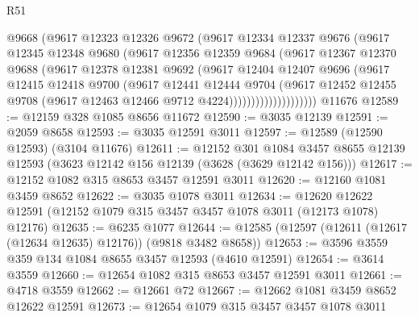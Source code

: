 \begin{lexlean}{R51}
\begin{coremodule}
                      @9668
                      (@9617
                        @12323
                        @12326
                        @9672
                        (@9617
                          @12334
                          @12337
                          @9676
                          (@9617
                            @12345
                            @12348
                            @9680
                            (@9617
                              @12356
                              @12359
                              @9684
                              (@9617
                                @12367
                                @12370
                                @9688
                                (@9617
                                  @12378
                                  @12381
                                  @9692
                                  (@9617
                                    @12404
                                    @12407
                                    @9696
                                    (@9617
                                      @12415
                                      @12418
                                      @9700
                                      (@9617
                                        @12441
                                        @12444
                                        @9704
                                        (@9617
                                          @12452
                                          @12455
                                          @9708
                                          (@9617 @12463 @12466 @9712 @4224))))))))))))))))))))
    @11676
@12589 := @12159 @328 @1085 @8656 @11672
@12590 := @3035 @12139
@12591 := @2059 @8658
@12593 := @3035 @12591 @3011
@12597 := @12589 (@12590 @12593) (@3104 @11676)
@12611 := @12152
    @301
    @1084
    @3457
    @8655
    @12139
    @12593
    (@3623 @12142 @156 @12139 (@3628 (@3629 @12142 @156)))
@12617 := @12152 @1082 @315 @8653 @3457 @12591 @3011
@12620 := @12160 @1081 @3459 @8652
@12622 := @3035 @1078 @3011
@12634 := @12620 @12622 @12591 (@12152 @1079 @315 @3457 @3457 @1078 @3011 (@12173 @1078) @12176)
@12635 := @6235 @1077
@12644 := @12585 (@12597 (@12611 (@12617 (@12634 @12635) @12176)) (@9818 @3482 @8658))
@12653 := @3596 @3559 @359 @134 @1084 @8655 @3457 @12593 (@4610 @12591)
@12654 := @3614 @3559
@12660 := @12654 @1082 @315 @8653 @3457 @12591 @3011
@12661 := @4718 @3559
@12662 := @12661 @72
@12667 := @12662 @1081 @3459 @8652 @12622 @12591
@12673 := @12654 @1079 @315 @3457 @3457 @1078 @3011

\end{coremodule}
\end{lexlean}
